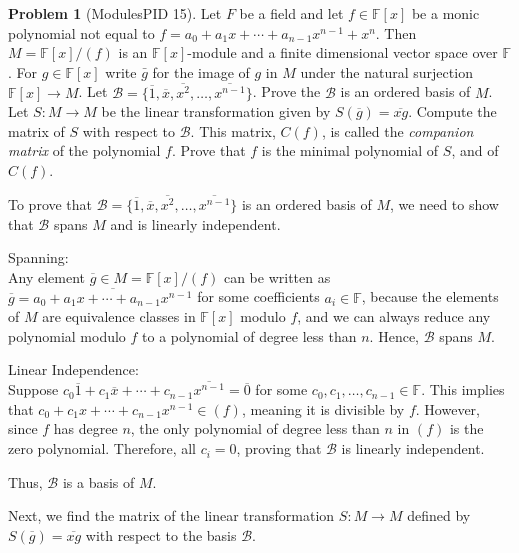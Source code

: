 \documentclass[12pt]{article}
\theoremstyle{definition}
\newtheorem{problem}{Problem}
\begin{document}
\begin{problem} [ModulesPID 15]
    Let $F$ be a field and let $f \in \mathbb{F}[x]$ be a monic polynomial not equal to $f = a_0 + a_1x + \cdots + a_{n-1}x^{n-1} + x^n$. 
    Then $M = \mathbb{F}[x]/(f)$ is an $\mathbb{F}[x]$-module and a finite dimensional vector space over $\mathbb{F}$. 
    For $g \in \mathbb{F}[x]$ write $\bar{g}$ for the image of $g$ in $M$ under the natural surjection $\mathbb{F}[x] \longrightarrow M$.
    Let $\mathcal{B} = \{\overline{1}, \overline{x}, \overline{x^2}, \ldots, \overline{x^{n-1}}\}$. Prove the $\mathcal{B}$ is an ordered basis of $M$. Let 
    $S: M \longrightarrow M$ be the linear transformation given by $S(\overline{g}) = \overline{xg}$. Compute the matrix of $S$ with respect to 
    $\mathcal{B}$. This matrix, $C(f)$, is called the \textit{companion matrix} of the polynomial $f$. Prove that $f$ is the minimal 
    polynomial of $S$, and of $C(f)$.

    \begin{solution}

        To prove that \( \mathcal{B} = \{\overline{1}, \overline{x}, \overline{x^2}, \ldots, \overline{x^{n-1}}\} \) is an ordered basis of \( M \), we need to show that \( \mathcal{B} \) spans \( M \) and is linearly independent.

        Spanning:  \\
        Any element \( \overline{g} \in M = \mathbb{F}[x]/(f) \) can be written as \( \overline{g} = \overline{a_0 + a_1 x + \cdots + a_{n-1} x^{n-1}} \) for some coefficients \( a_i \in \mathbb{F} \), because the elements of \( M \) are equivalence classes in \( \mathbb{F}[x] \) modulo \( f \), and we can always reduce any polynomial modulo \( f \) to a polynomial of degree less than \( n \). Hence, \( \mathcal{B} \) spans \( M \).

        Linear Independence:\\  
        Suppose \( c_0 \overline{1} + c_1 \overline{x} + \cdots + c_{n-1} \overline{x^{n-1}} = \overline{0} \) for some \( c_0, c_1, \ldots, c_{n-1} \in \mathbb{F} \). This implies that \( c_0 + c_1 x + \cdots + c_{n-1} x^{n-1} \in (f) \), meaning it is divisible by \( f \). However, since \( f \) has degree \( n \), the only polynomial of degree less than \( n \) in \( (f) \) is the zero polynomial. Therefore, all \( c_i = 0 \), proving that \( \mathcal{B} \) is linearly independent.

        Thus, \( \mathcal{B} \) is a basis of \( M \).

        Next, we find the matrix of the linear transformation \( S: M \longrightarrow M \) defined by \( S(\overline{g}) = \overline{xg} \) with respect to the basis \( \mathcal{B} \).


\end{solution}
\end{problem}
\end{document}
